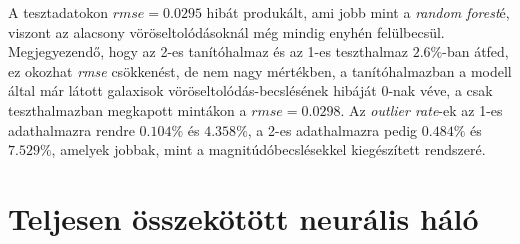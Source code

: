 \documentclass[12pt,letterpaper,oneside,openright]{book}
\begin{document}
A tesztadatokon $\textit{rmse} =0.0295$ hibát produkált, ami jobb mint a \textit{random forest}é, viszont az alacsony vöröseltolódásoknál még mindig enyhén felülbecsül. Megjegyezendő, hogy az 2-es tanítóhalmaz és az 1-es teszthalmaz $2.6\%$-ban átfed, ez okozhat \textit{rmse} csökkenést, de nem nagy mértékben, a tanítóhalmazban a modell által már látott galaxisok vöröseltolódás-becslésének hibáját $0$-nak véve, a csak teszthalmazban megkapott mintákon a $rmse = 0.0298$. Az \textit{outlier rate}-ek az 1-es adathalmazra rendre $0.104\%$ és $4.358\%$, a 2-es adathalmazra pedig $0.484\%$ és $7.529\%$, amelyek jobbak, mint a magnitúdóbecslésekkel kiegészített rendszeré.
\section{Teljesen összekötött neurális háló}
\end{document}
